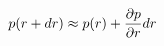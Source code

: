 \documentclass[preview]{standalone}
\begin{document}
\begin{align*}
\special{dvisvgm:raw <g id='unique000'>}p(r+dr) \approx p(r) + \frac{\partial p}{\partial r} dr\special{dvisvgm:raw </g>}
\end{align*}
\end{document}
